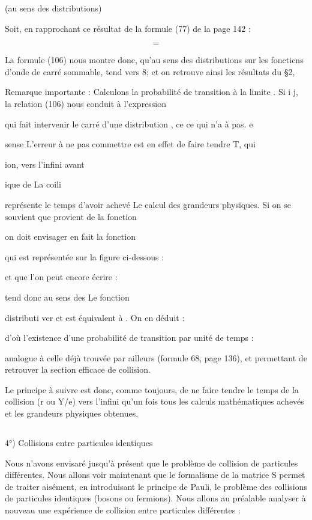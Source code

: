 {{{(au sens
des distributions)

Soit, en rapprochant ce résultat de la formule (77) de la page 142 :

\[
\tag{106}=
\]


La formule (106) nous montre donc, qu'au sens des
distributions sur les foncticns d'onde de carré sommable,
 tend vers 8; et on retrouve ainsi les résultats du \S 2,

Remarque  importante : Calculons la probabilité de transition
 à la limite . Si i  j, la relation
(106) nous conduit à l'expression

qui fait intervenir le carré d'une distribution , ce ce qui n'a à pas. e

sense L'erreur à ne pas commettre est en effet de faire tendre T, qui

ion, vers l'infini avant

ique de La coili

représente le temps
d'avoir achevé Le calcul des grandeurs physiques.
Si on se souvient que  provient de la fonction

 on doit envisager en fait la fonction

qui est représentée sur la figure ci-dessous :


et que l'on peut encore écrire :

tend donc au sens des
Le fonction

distributi ver et est équivalent à .
On en déduit :

d'où l'existence d'une probabilité de transition par unité de
temps :

analogue à celle déjà trouvée par ailleurs (formule 68, page 136),
et permettant de retrouver la section efficace de collision.

Le principe à suivre est donc, comme toujours, de ne faire tendre
le temps de la collision (r ou Y/e) vers l'infini qu'un fois tous
les calculs mathématiques achevés et les grandeurs physiques obtenues,

\subsection{}%
4°) Collisions entre particules identiques

Nous n'avons envisaré jusqu'à présent que le problème de
collision de particules différentes. Nous allons voir maintenant
que le formalisme de la matrice S permet de traiter aisément, en introduisant le
principe de Pauli, le problème des collisions de particules identiques (bosons ou
fermions). Nous allons au préalable
analyser à nouveau une expérience de collision entre particules différentes :
}}}
